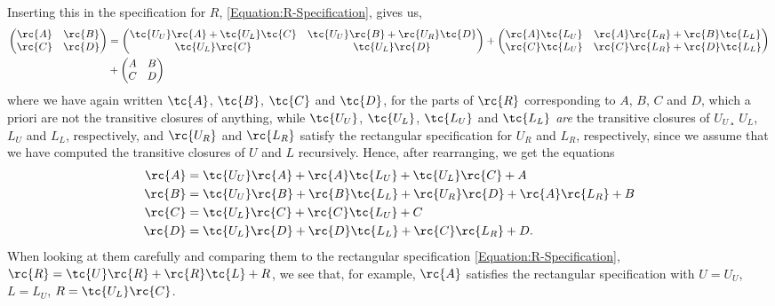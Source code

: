 Inserting this in the specification for $R$, \eqref{Equation:R-Specification}, gives us,
\begin{align*}
  \begin{pmatrix}
    \rc{A} & \rc{B} \\
    \rc{C} & \rc{D}
  \end{pmatrix} &= 
  \begin{pmatrix}
    \tc{U_U}\rc{A} + \tc{U_L}\tc{C}  &  \tc{U_U}\rc{B} + \rc{U_R}\tc{D} \\
    \tc{U_L}\rc{C}                   &  \tc{U_L}\rc{D}
  \end{pmatrix}
  +
  \begin{pmatrix}
    \rc{A}\tc{L_U}        &   \rc{A}\rc{L_R} + \rc{B}\tc{L_L}\\
    \rc{C}\tc{L_U}        &   \rc{C}\rc{L_R} + \rc{D}\tc{L_L}
  \end{pmatrix}
  \\&+
  \begin{pmatrix}
    A & B \\
    C & D
  \end{pmatrix}
\end{align*}
where we have again written $\tc{A}$, $\tc{B}$, $\tc{C}$ and $\tc{D}$, for the parts of $\rc{R}$ corresponding to $A$, $B$, $C$ and $D$, which a priori are not the transitive closures of anything, while $\tc{U_U}$, $\tc{U_L}$, $\tc{L_U}$ and $\tc{L_L}$ \emph{are} the transitive closures of $U_U$¸ $U_L$, $L_U$ and $L_L$, respectively, and $\rc{U_R}$ and $\rc{L_R}$ satisfy the rectangular specification for $U_R$ and $L_R$, respectively, since we assume that we have computed the transitive closures of $U$ and $L$ recursively.
Hence, after rearranging, we get the equations
\begin{align*}
  \rc{A} &= \tc{U_U}\rc{A} + \rc{A}\tc{L_U} + \tc{U_L}\rc{C} + A \\
  \rc{B} &= \tc{U_U}\rc{B} + \rc{B}\tc{L_L} + \rc{U_R}\rc{D} + \rc{A}\rc{L_R} + B \\
  \rc{C} &= \tc{U_L}\rc{C} + \rc{C}\tc{L_U} + C\\
  \rc{D} &= \tc{U_L}\rc{D} + \rc{D}\tc{L_L} + \rc{C}\rc{L_R} +  D.
\end{align*}
When looking at them carefully and comparing them to the rectangular specification \eqref{Equation:R-Specification}, $\rc{R} = \tc{U}\rc{R} + \rc{R}\tc{L} + R$, we see that, for example, $\rc{A}$ satisfies the rectangular specification with $U = U_U$, $L = L_U$, $R = \tc{U_L}\rc{C}$.

